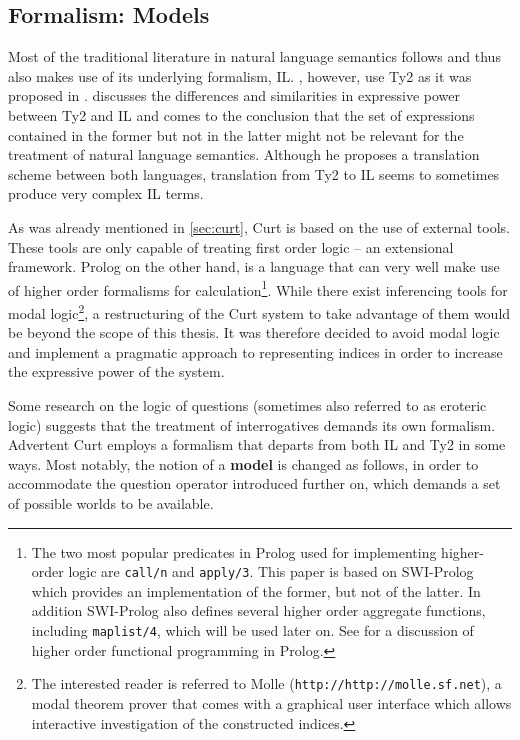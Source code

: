 \documentclass[a4paper]{article}
\newcommand{\abbr}{\textsf} %
\newcommand{\term}[1]{\textsf{\textbf{#1}}} %
\newcommand{\code}[1]{\texttt{#1}} %
\newcommand{\pn}{\textsf} %
\newcommand{\url}[1]{\code{http://#1}} %
\newcommand{\curt}{\pn{Curt}}
\newcommand{\acurt}{\pn{Advertent Curt}}
\newcommand{\prol}{\pn{Prolog}}
\theoremstyle{remark}
\theoremstyle{remark}
\theoremstyle{definition}
\theoremstyle{definition}
\begin{document}
\subsection{Formalism: Models}\label{sec:formal}

Most of the traditional literature in natural language semantics follows
\cite{ptq} and thus also makes use of its underlying formalism,
\abbr{IL}. \cite{gs:sqpa}, however, use \abbr{Ty2} as it was
proposed in \cite{gallin:ty2}. \cite{z:ilty2} discusses the differences and
similarities in expressive power between \abbr{Ty2} and \abbr{IL} and comes to
the conclusion that the set of expressions contained in the former but not in
the latter might not be relevant for the treatment of natural language
semantics. Although he proposes a translation scheme between both languages,
translation from \abbr{Ty2} to \abbr{IL} seems to sometimes produce very complex
\abbr{IL} terms.

As was already mentioned in \ref{sec:curt}, \curt{} is based on 
the use of external tools. These tools are only capable of treating first order logic – an
extensional framework. \prol{} on the other hand, is a language that can very well
make use of higher order formalisms for calculation\footnote{The two most
popular predicates in \prol{} used for implementing higher-order logic are
\code{call/n} and \code{apply/3}. This paper is based on \pn{SWI-Prolog} which
provides an implementation of the former, but not of the latter. In addition
\pn{SWI-Prolog} also defines several higher order aggregate functions, including
\code{maplist/4}, which will be used later on. See \cite{naish:prolhio} for a
discussion of higher order functional programming in \prol.}.  While there exist
inferencing tools for modal logic\footnote{ The interested reader is referred to
\pn{Molle} (\url{http://molle.sf.net}), a modal theorem prover that comes with a
graphical user interface which allows interactive investigation of the
constructed indices.}, a restructuring of the \curt{} system to take advantage
of them would be beyond the scope of this thesis.  It was therefore decided to
avoid modal logic and implement a pragmatic approach to representing indices in
order to increase the expressive power of the system.

Some research on the logic of questions (sometimes also referred to as eroteric
logic) suggests that the treatment of interrogatives demands its own formalism.
\acurt{} employs a formalism that departs from both \abbr{IL} and \abbr{Ty2} in
some ways. Most notably, the notion of a \term{model} is changed as follows, in
order to accommodate the question operator introduced further on, which demands
a set of possible worlds to be available.
\end{document}
